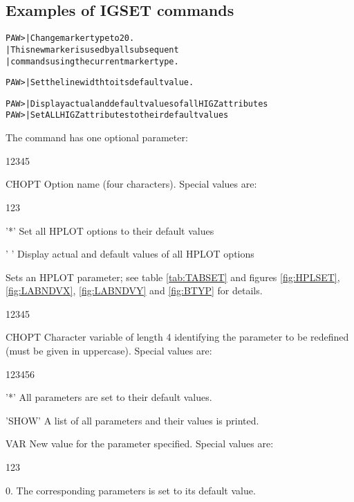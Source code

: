 \subsection*{Examples of IGSET commands}
\begin{alltt}
PAW >        | Change marker type to 20.
                          | This new marker is used by all subsequent
                          | commands using the current marker type.

PAW >           | Set the line width to its default value.

PAW >                | Display actual and default values of all HIGZ attributes
PAW >              | Set ALL HIGZ attributes to their default values
\end{alltt}


The  command has one optional parameter:
\begin{DLtt}{12345}
\item[CHOPT] Option name (four characters). Special values are:
    \begin{DLtt}{123}
      \item['*'] Set all HPLOT options to their default values
      \item[' '] Display actual and default values of all HPLOT options
    \end{DLtt}
\end{DLtt}


Sets an HPLOT parameter; see table \ref{tab:TABSET} and figures
\ref{fig:HPLSET}, \ref{fig:LABNDVX}, \ref{fig:LABNDVY} and \ref{fig:BTYP}
for details.

\begin{DLtt}{12345}
\item[CHOPT] Character variable of length 4 identifying the
             parameter to be redefined (must be given in uppercase). 
             Special values are:
    \begin{DLtt}{123456}
      \item['*']    All parameters are set to their default values.
      \item['SHOW'] A list of all parameters and their values is printed.
    \end{DLtt}
\item[VAR]   New value for the parameter specified. Special values are:
    \begin{DLtt}{123}
      \item[0.] The corresponding parameters is set to its default value.
    \end{DLtt}
\end{DLtt}

